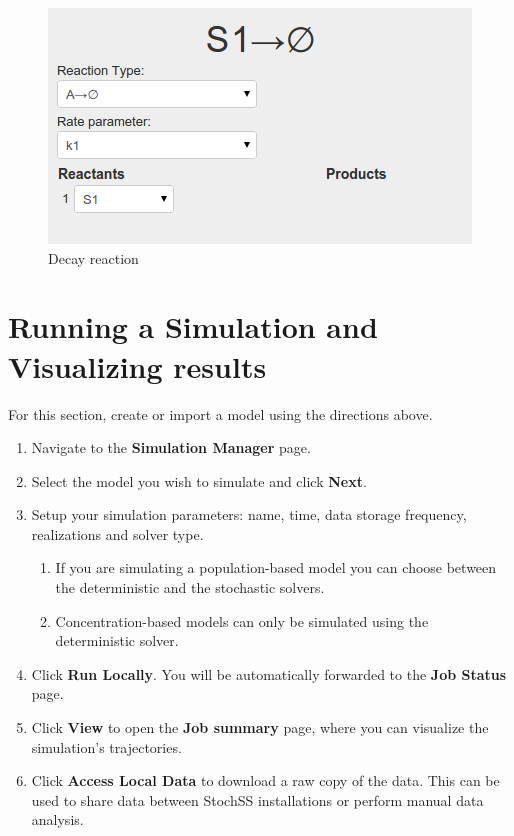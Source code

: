 \begin{figure}[!htb]
\centering
\includegraphics[scale=0.64]{T1/reaction1.png}
\caption{Decay reaction}
\label{fig:reaction1}
\end{figure}

\section{Running a Simulation and Visualizing results}

For this section, create or import a model using the directions above.

\begin{enumerate}
  \item Navigate to the \textbf{Simulation Manager} page.
  \item Select the model you wish to simulate and click \textbf{Next}.
  \item Setup your simulation parameters: name, time, data storage frequency, realizations and solver type. 
  \begin{enumerate}
    \item If you are simulating a population-based model you can choose between the deterministic and the stochastic solvers.
    \item Concentration-based models can only be simulated using the deterministic solver.
  \end{enumerate}  
  \item Click \textbf{Run Locally}. You will be automatically forwarded to the \textbf{Job Status} page.%
  \item Click \textbf{View} to open the \textbf{Job summary} page, where you can visualize the simulation's trajectories.
  \item Click \textbf{Access Local Data} to download a raw copy of the data. This can be used to share data between StochSS installations or perform manual data analysis.
\end{enumerate}

